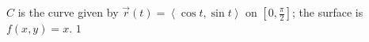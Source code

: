 {$C$ is the curve given by $\vec r(t)=\left<\cos t, \sin t\right>$ on $\left[0,\frac{\pi}{2}\right]$; the surface is $f(x,y)=x$. 
}
{$1$}
